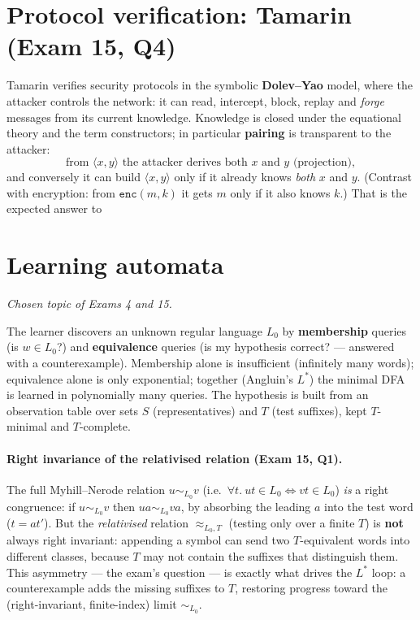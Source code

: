 \documentclass[oneside]{academica}
\begin{document}
\section{Protocol verification: Tamarin (Exam 15, Q4)}
Tamarin verifies security protocols in the symbolic
\textbf{Dolev--Yao} model, where the attacker controls the network: it
can read, intercept, block, replay and \emph{forge} messages from its
current knowledge. Knowledge is closed under the equational theory and
the term constructors; in particular \textbf{pairing} is transparent to
the attacker:
\[
  \text{from } \langle x,y\rangle \text{ the attacker derives both } x
  \text{ and } y \text{ (projection)},
\]
and conversely it can build $\langle x,y\rangle$ only if it already knows
\emph{both} $x$ and $y$. (Contrast with encryption: from $\mathtt{enc}(m,
k)$ it gets $m$ only if it also knows $k$.) That is the expected answer
to 

\section{Learning automata}
\emph{Chosen topic of Exams 4 and 15.}

The learner discovers an unknown regular language $L_0$ by
\textbf{membership} queries (is $w\in L_0$?) and \textbf{equivalence}
queries (is my hypothesis correct? --- answered with a counterexample).
Membership alone is insufficient (infinitely many words); equivalence
alone is only exponential; together (Angluin's $L^*$) the minimal DFA is
learned in polynomially many queries. The hypothesis is built from an
observation table over sets $S$ (representatives) and $T$ (test
suffixes), kept $T$-minimal and $T$-complete.

\paragraph{Right invariance of the relativised relation (Exam 15, Q1).}
The full Myhill--Nerode relation $u\sim_{L_0}v$ (i.e.\ $\forall t.\ ut\in
L_0\iff vt\in L_0$) \emph{is} a right congruence: if $u\sim_{L_0}v$ then
$ua\sim_{L_0}va$, by absorbing the leading $a$ into the test word
($t=at'$). But the \emph{relativised} relation
$\approx_{L_0,T}$ (testing only over a finite $T$) is \textbf{not} always
right invariant: appending a symbol can send two $T$-equivalent words
into different classes, because $T$ may not contain the suffixes that
distinguish them. This asymmetry --- the exam's question --- is exactly
what drives the $L^*$ loop: a counterexample adds the missing suffixes to
$T$, restoring progress toward the (right-invariant, finite-index) limit
$\sim_{L_0}$.
\end{document}
